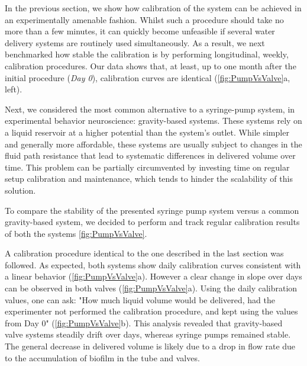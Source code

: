 In the previous section, we show how calibration of the system can be achieved in an experimentally amenable fashion. Whilst such a procedure should take no more than a few minutes, it can quickly become unfeasible if several water delivery systems are routinely used simultaneously. As a result, we next benchmarked how stable the calibration is by performing longitudinal, weekly, calibration procedures. Our data shows that, at least, up to one month after the initial procedure (\textit{Day 0}), calibration curves are identical (\cref{fig:PumpVsValve}a, left).

Next, we considered the most common alternative to a syringe-pump system, in experimental behavior neuroscience: gravity-based systems. These systems rely on a liquid reservoir at a higher potential than the system's outlet. While simpler and generally more affordable, these systems are usually subject to changes in the fluid path resistance that lead to systematic differences in delivered volume over time. This problem can be partially circumvented by investing time on regular setup calibration and maintenance, which tends to hinder the scalability of this solution.

To compare the stability of the presented syringe pump system versus a common gravity-based system, we decided to perform and track regular calibration results of both the systems \cref{fig:PumpVsValve}.

A calibration procedure identical to the one described in the last section was followed. As expected, both systems show daily calibration curves consistent with a linear behavior (\cref{fig:PumpVsValve}a). However a clear change in slope over days can be observed in both valves (\cref{fig:PumpVsValve}a). Using the daily calibration values, one can ask: "How much liquid volume would be delivered, had the experimenter not performed the calibration procedure, and kept using the values from Day 0" (\cref{fig:PumpVsValve}b). This analysis revealed that gravity-based valve systems steadily drift over days, whereas syringe pumps remained stable. The general decrease in delivered volume is likely due to a drop in flow rate due to the accumulation of biofilm in the tube and valves. 

